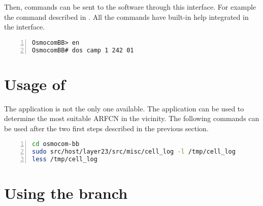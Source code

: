 Then, commands can be sent to the software through this interface. For
example the  command described in
. All the commands have built-in help integrated
in the interface.

      \begin{lstlisting}[numbers=left,
basicstyle=\footnotesize, breaklines=true, frame=single]
OsmocomBB> en
OsmocomBB# dos camp 1 242 01
      \end{lstlisting}

\iffalse
\subsection{Sending a silent SMS message}

This is an example of the modified \prog{mobile} application usage to
send a silent SMS message. These commands need to be written in the
\prog{telnet} prompt. If the \prog{mobile} application was started with
the \code{-i 127.0.0.1} argument, all the layer 3 messages are readable
in \proj{Wireshark} if it is listening on the \code{localhost}.

      \begin{lstlisting}[numbers=left,
basicstyle=\footnotesize, breaklines=true, frame=single]
OsmocomBB> en
OsmocomBB# silent 1 1
OsmocomBB# sms 1 +47123456 Example of silent SMS message
      \end{lstlisting}
\fi

\section{Usage of }

The  application is not the only one available. The
 application can be used to determine the most suitable
ARFCN in the vicinity. The following commands can be used after the two
first steps described in the previous section.

      \begin{lstlisting}[language=bash, numbers=left,
basicstyle=\footnotesize, breaklines=true, frame=single]
cd osmocom-bb
sudo src/host/layer23/src/misc/cell_log -l /tmp/cell_log
less /tmp/cell_log
      \end{lstlisting}

\section{Using the  branch}

